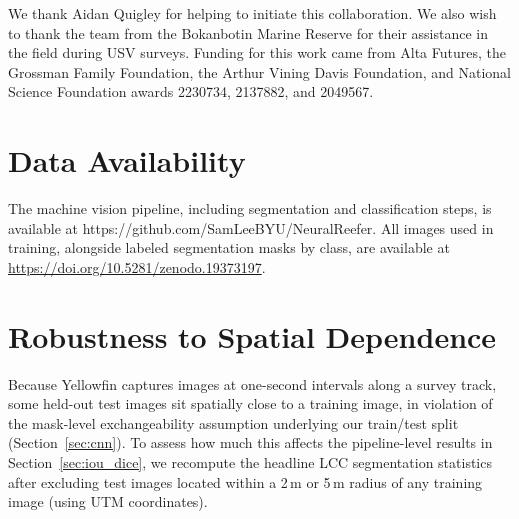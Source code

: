 \documentclass[11pt]{elsarticle}
\begin{document}
We thank Aidan Quigley for helping to initiate this collaboration. We also wish to thank the team from the Bokanbotin Marine Reserve for their assistance in the field during USV surveys. Funding for this work came from Alta Futures, the Grossman Family Foundation, the Arthur Vining Davis Foundation, and National Science Foundation awards 2230734, 2137882, and 2049567.

\section*{Data Availability}
The machine vision pipeline, including segmentation and classification steps, is available at https://github.com/SamLeeBYU/NeuralReefer. All images used in training, alongside labeled segmentation masks by class, are available at \url{https://doi.org/10.5281/zenodo.19373197}.

\appendix
\section{Robustness to Spatial Dependence}
\label{app:spatial}

Because Yellowfin captures images at one-second intervals along a survey track, some held-out test images sit spatially close to a training image, in violation of the mask-level exchangeability assumption underlying our train/test split (Section~\ref{sec:cnn}). To assess how much this affects the pipeline-level results in Section~\ref{sec:iou_dice}, we recompute the headline LCC segmentation statistics after excluding test images located within a 2\,m or 5\,m radius of any training image (using UTM coordinates).
\end{document}
